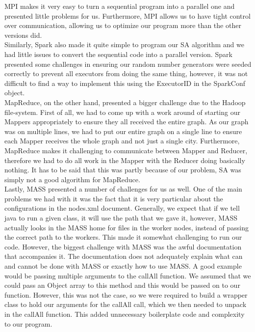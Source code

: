 \documentclass{article}
\begin{document}
			MPI makes it very easy to turn a sequential program into a parallel one and presented little problems for us. Furthermore, MPI allows us to have tight control over communication, allowing us to optimize our program more than the other versions did.\\
			
			Similarly, Spark also made it quite simple to program our SA algorithm and we had little issues to convert the sequential code into a parallel version. Spark presented some challenges in ensuring our random number generators were seeded correctly to prevent all executors from doing the same thing, however, it was not difficult to find a way to implement this using the ExecutorID in the SparkConf object. \\
			
			MapReduce, on the other hand, presented a bigger challenge due to the Hadoop file-system. First of all, we had to come up with a work around of starting our Mappers appropriately to ensure they all received the entire graph. As our graph was on multiple lines, we had to put our entire graph on a single line to ensure each Mapper receives the whole graph and not just a single city. Furthermore, MapReduce makes it challenging to communicate between Mapper and Reducer, therefore we had to do all work in the Mapper with the Reducer doing basically nothing. It has to be said that this was partly because of our problem, SA was simply not a good algorithm for MapReduce.\\
			
			Lastly, MASS presented a number of challenges for us as well. One of the main problems we had with it was the fact that it is very particular about the configurations in the nodes.xml document. Generally, we expect that if we tell java to run a given class, it will use the path that we gave it, however, MASS actually looks in the MASS home for files in the worker nodes, instead of passing the correct path to the workers. This made it somewhat challenging to run our code. However, the biggest challenge with MASS was the awful documentation that accompanies it. The documentation does not adequately explain what can and cannot be done with MASS or exactly how to use MASS. A good example would be passing multiple arguments to the callAll function. We assumed that we could pass an Object array to this method and this would be passed on to our function. However, this was not the case, so we were required to build a wrapper class to hold our arguments for the callAll call, which we then needed to unpack in the callAll function. This added unnecessary boilerplate code and complexity to our program. \\
			 
\end{document}
